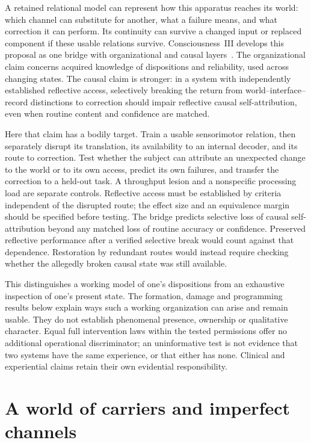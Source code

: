 \documentclass[11pt]{article}
\theoremstyle{definition}
\theoremstyle{remark}
\begin{document}
A retained relational model can represent how this apparatus reaches its
world: which channel can substitute for another, what a failure means,
and what correction it can perform. Its continuity can survive a changed
input or replaced component if these usable relations survive.
Consciousness~III develops this proposal as one bridge with organizational
and causal layers~\cite{ConsciousnessIII}. The organizational claim concerns
acquired knowledge of dispositions and reliability, used across changing
states. The causal claim is stronger: in a system with independently
established reflective access, selectively breaking the return from
world--interface--record distinctions to correction should impair reflective
causal self-attribution, even when routine content and confidence are matched.

Here that claim has a bodily target. Train a usable sensorimotor relation,
then separately disrupt its translation, its availability to an internal
decoder, and its route to correction. Test whether the subject can attribute
an unexpected change to the world or to its own access, predict its own
failures, and transfer the correction to a held-out task. A throughput lesion
and a nonspecific processing load are separate controls. Reflective access
must be established by criteria independent of the disrupted route; the
effect size and an equivalence margin should be specified before testing.
The bridge predicts selective loss of causal self-attribution beyond any
matched loss of routine accuracy or confidence. Preserved reflective
performance after a verified selective break would count against that
dependence. Restoration by redundant routes would instead require checking
whether the allegedly broken causal state was still available.

This distinguishes a working model of one's dispositions from an exhaustive
inspection of one's present state. The formation, damage and programming
results below explain ways such a working organization can arise and remain
usable. They do not establish phenomenal presence, ownership or qualitative
character. Equal full intervention laws within the tested permissions offer
no additional operational discriminator; an uninformative test is not
evidence that two systems have the same experience, or that either has none.
Clinical and experiential claims retain their own evidential responsibility.

\section{A world of carriers and imperfect channels}
\label{sec:source}
\end{document}
